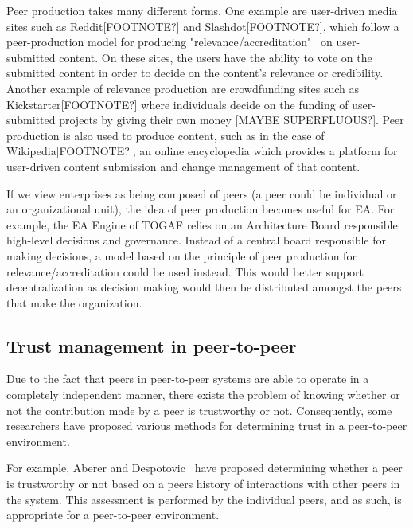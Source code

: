 
Peer production takes many different forms. One example are user-driven media sites such as Reddit[FOOTNOTE?] and Slashdot[FOOTNOTE?], which follow a peer-production model for producing "relevance/accreditation"~\cite{benkler2006wealth} on user-submitted content. On these sites, the users have the ability to vote on the submitted content in order to decide on the content's relevance or credibility. Another example of relevance production are crowdfunding sites such as Kickstarter[FOOTNOTE?] where individuals decide on the funding of user-submitted projects by giving their own money [MAYBE SUPERFLUOUS?]. Peer production is also used to produce content, such as in the case of Wikipedia[FOOTNOTE?], an online encyclopedia which provides a platform for user-driven content submission and change management of that content.


If we view enterprises as being composed of peers (a peer could be individual or an organizational unit), the idea of peer production becomes useful for EA. For example, the EA  Engine of TOGAF relies on an Architecture Board responsible high-level decisions and governance. Instead of a central board responsible for making decisions, a model based on the principle of peer production for relevance/accreditation could be used instead. This would better support decentralization as decision making would then be distributed amongst the peers that make the organization.

%
%

\subsection{Trust management in peer-to-peer}


Due to the fact that peers in peer-to-peer systems are able to operate in a completely independent manner, there exists the problem of knowing whether or not the contribution made by a peer is trustworthy or not. Consequently, some researchers have proposed various methods for determining trust in a peer-to-peer environment.


For example, Aberer and Despotovic~\cite{aberer2001managing} have proposed determining whether a peer is trustworthy or not based on a peers history of interactions with other peers in the system. This assessment is performed by the individual peers, and as such, is appropriate for a peer-to-peer environment.

